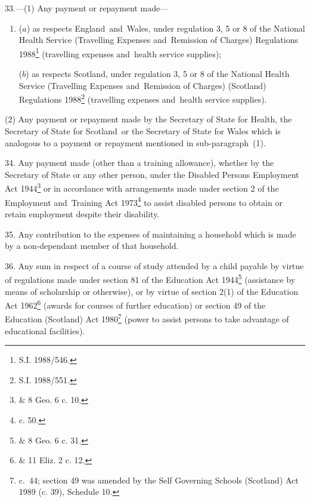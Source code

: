 \documentclass[12pt,a4paper]{article}
\begin{document}
\medskip

33.—(1) Any payment or repayment made—
\begin{enumerate}\item[]
($a$) as respects England~and~Wales, under regulation 3, 5 or 8 of the National Health Service (Travelling Expenses and~Remission of Charges) Regulations 1988\footnote{\frenchspacing S.I. 1988/546.} (travelling expenses and~health service supplies);

($b$) as respects Scotland, under regulation 3, 5 or 8 of the National Health Service (Travelling Expenses and~Remission of Charges) (Scotland) Regulations 1988\footnote{\frenchspacing S.I. 1988/551.} (travelling expenses and~health service supplies).
\end{enumerate}

(2) Any payment or repayment made by the Secretary of State for Health, the Secretary of State for Scotland~or the Secretary of State for Wales which is analogous to a payment or repayment mentioned in sub-paragraph~(1).

\medskip

34.  Any payment made (other than a training allowance), whether by the Secretary of State or any other person, under the Disabled Persons Employment Act 1944\footnote{ \& 8 Geo. 6 c. 10.} or in accordance with arrangements made under section 2 of the Employment and~Training Act 1973\footnote{ c. 50.} to assist disabled persons to obtain or retain employment despite their disability.

\medskip

35.  Any contribution to the expenses of maintaining a household which is made by a non-dependant member of that household.

\medskip

36.  Any sum in respect of a course of study attended by a child payable by virtue of regulations made under section 81 of the Education Act 1944\footnote{ \& 8 Geo. 6 c. 31.} (assistance by means of scholarship or otherwise), or by virtue of section 2(1) of the Education Act 1962\footnote{ \& 11 Eliz. 2 c. 12.} (awards for courses of further education) or section 49 of the Education (Scotland) Act 1980\footnote{ c.~44; section 49 was amended by the Self Governing Schools (Scotland) Act 1989 (c. 39), Schedule 10.} (power to assist persons to take advantage of educational facilities).

\medskip
\end{document}
